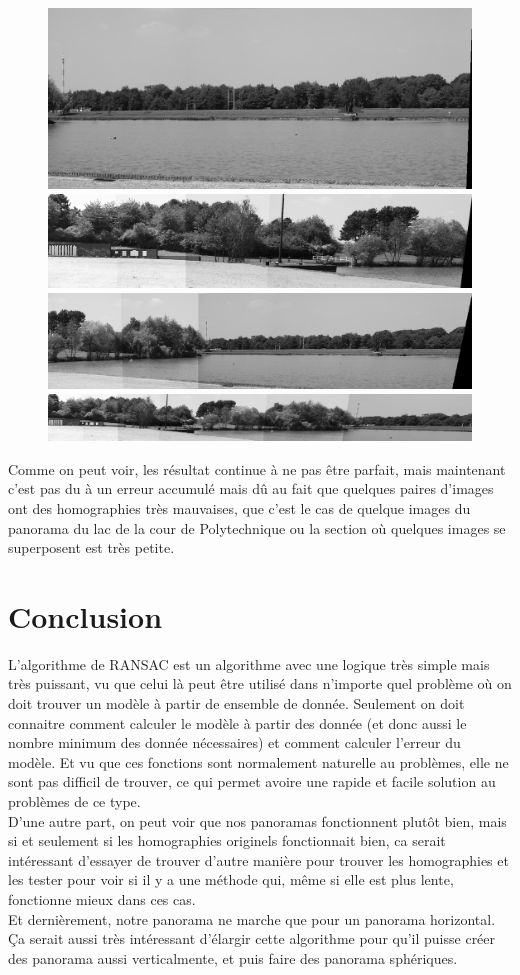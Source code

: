 \documentclass[11pt]{article}
\begin{document}
\begin{figure}[H]
\includegraphics[width=.2\textwidth]{../resources/output/binary_panorama_selected3.jpg}
\includegraphics[width=.4\textwidth]{../resources/output/binary_panorama_selected4.jpg}
\includegraphics[width=.4\textwidth]{../resources/output/binary_panorama_selected5.jpg}
\includegraphics[width=.8\textwidth]{../resources/output/binary_panorama_selected6.jpg}
\end{figure}

Comme on peut voir, les résultat continue à ne pas être parfait, mais maintenant c’est pas du à un erreur accumulé mais dû au fait que quelques paires d’images ont des homographies très mauvaises, que c’est le cas de quelque images du panorama du lac de la cour de Polytechnique ou la section où quelques images se superposent est très petite.

\section{Conclusion}

L’algorithme de RANSAC est un algorithme avec une logique très simple mais très puissant, vu que celui là peut être utilisé dans n’importe quel problème où on doit trouver un modèle à partir de ensemble de donnée. Seulement on doit connaitre comment calculer le modèle à partir des donnée (et donc aussi le nombre minimum des donnée nécessaires) et comment calculer l’erreur du modèle. Et vu que ces fonctions sont normalement naturelle au problèmes, elle ne sont pas difficil de trouver, ce qui permet avoire une rapide et facile solution au problèmes de ce type. \\
D’une autre part, on peut voir que nos panoramas fonctionnent plutôt bien, mais si et seulement si les homographies originels fonctionnait bien, ca serait intéressant d’essayer de trouver d’autre manière pour trouver les homographies et les tester pour voir si il y a une méthode qui, même si elle est plus lente, fonctionne mieux dans ces cas. \\
Et dernièrement, notre panorama ne marche que pour un panorama horizontal. Ça serait aussi très intéressant d'élargir cette algorithme pour qu’il puisse créer des panorama aussi verticalmente, et puis faire des panorama sphériques.  
\end{document}
